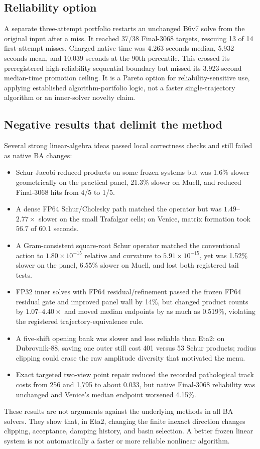 \documentclass[10pt]{article}
\begin{document}
\subsection{Reliability option}

A separate three-attempt portfolio restarts an unchanged B6v7 solve from the original input after a miss.  It reached 37/38 Final-3068 targets, rescuing 13 of 14 first-attempt misses.  Charged native time was 4.263 seconds median, 5.932 seconds mean, and 10.039 seconds at the 90th percentile.  This crossed its preregistered high-reliability sequential boundary but missed its 3.923-second median-time promotion ceiling.  It is a Pareto option for reliability-sensitive use, applying established algorithm-portfolio logic\cite{GomesSelman2001}, not a faster single-trajectory algorithm or an inner-solver novelty claim.

\subsection{Negative results that delimit the method}

Several strong linear-algebra ideas passed local correctness checks and still failed as native BA changes:
\begin{itemize}
  \item Schur-Jacobi reduced products on some frozen systems but was 1.6\% slower geometrically on the practical panel, 21.3\% slower on Muell, and reduced Final-3068 hits from 4/5 to 1/5.
  \item A dense FP64 Schur/Cholesky path matched the operator but was $1.49$--$2.77\times$ slower on the small Trafalgar cells; on Venice, matrix formation took 56.7 of 60.1 seconds.
  \item A Gram-consistent square-root Schur operator matched the conventional action to $1.80\times10^{-15}$ relative and curvature to $5.91\times10^{-15}$, yet was 1.52\% slower on the panel, 6.55\% slower on Muell, and lost both registered tail tests.
  \item FP32 inner solves with FP64 residual/refinement passed the frozen FP64 residual gate and improved panel wall by 14\%, but changed product counts by $1.07$--$4.40\times$ and moved median endpoints by as much as 0.519\%, violating the registered trajectory-equivalence rule.
  \item A five-shift opening bank was slower and less reliable than Eta2: on Dubrovnik-88, saving one outer still cost 401 versus 53 Schur products; radius clipping could erase the raw amplitude diversity that motivated the menu.
  \item Exact targeted two-view point repair reduced the recorded pathological track costs from 256 and 1,795 to about 0.033, but native Final-3068 reliability was unchanged and Venice's median endpoint worsened 4.15\%.
\end{itemize}
These results are not arguments against the underlying methods in all BA solvers.  They show that, in Eta2, changing the finite inexact direction changes clipping, acceptance, damping history, and basin selection.  A better frozen linear system is not automatically a faster or more reliable nonlinear algorithm.
\end{document}
